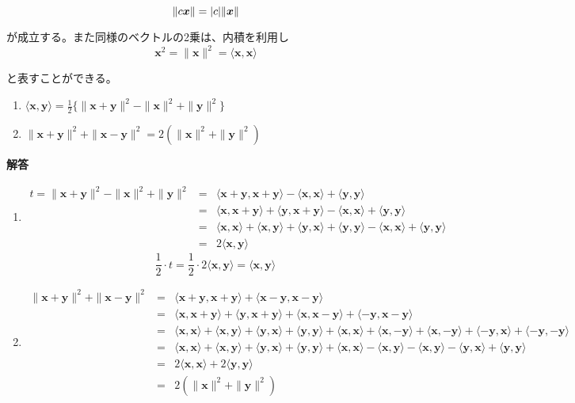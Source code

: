 \documentclass[dvipdfmx,autodetect-engine]{jsarticle}
\theoremstyle{definition}
\newcommand{\innerProduct}[2]{\langle \bm{#1}, \bm{#2} \rangle}
\newcommand{\nrm}[1]{\|\bm{#1}\|}
\DeclarePairedDelimiter{\abs}{\lvert}{\rvert}
\begin{document}
$$
\|c\bm{x}\| = \abs{c}\|\bm{x}\|
$$

が成立する。また同様のベクトルの2乗は、内積を利用し
$$
\bm{x}^2  = \nrm{x}^2 = \innerProduct{x}{x}
$$

と表すことができる。


\begin{enumerate}
\renewcommand{\labelenumi}{(\arabic{enumi})}
\item $\innerProduct{x}{y} = \frac{1}{2}\{ \|\bm{x} + \bm{y}\|^2 - \|\bm{x}\|^2 + \|\bm{y}\|^2 \}$
\item $\|\bm{x} + \bm{y}\|^2 + \|\bm{x} - \bm{y}\|^2 = 2(\|\bm{x}\|^2 + \|\bm{y}\|^2)$
\end{enumerate}

{\bf 解答}

\begin{enumerate}
\renewcommand{\labelenumi}{(\arabic{enumi})}

\item \begin{eqnarray*}
t = \|\bm{x} + \bm{y}\|^2 - \|\bm{x}\|^2 + \|\bm{y}\|^2 &= &\langle \bm{x} + \bm{y}, \bm{x} + \bm{y} \rangle - \innerProduct{x}{x} +\innerProduct{y}{y} \\
&= &\langle \bm{x}, \bm{x} + \bm{y} \rangle + \langle \bm{y}, \bm{x} + \bm{y} \rangle - \innerProduct{x}{x} +\innerProduct{y}{y} \\
&= &\innerProduct{x}{x} +\innerProduct{x}{y} + \innerProduct{y}{x} +\innerProduct{y}{y} - \innerProduct{x}{x} +\innerProduct{y}{y} \\
&= & 2 \innerProduct{x}{y}
\end{eqnarray*}
$$
\frac{1}{2} \cdot t = \frac{1}{2} \cdot 2\innerProduct{x}{y} = \innerProduct{x}{y}
$$

\item 
\begin{eqnarray*}
\|\bm{x} + \bm{y}\|^2 + \|\bm{x} - \bm{y}\|^2 &= &\langle \bm{x} + \bm{y}, \bm{x} + \bm{y} \rangle + \langle \bm{x} - \bm{y}, \bm{x} - \bm{y} \rangle \\
&= &\langle \bm{x}, \bm{x} + \bm{y} \rangle + \langle \bm{y}, \bm{x} + \bm{y} \rangle + \langle \bm{x}, \bm{x} - \bm{y} \rangle + \langle -\bm{y}, \bm{x} - \bm{y} \rangle \\
&= &\innerProduct{x}{x} + \innerProduct{x}{y} + \innerProduct{y}{x} + \innerProduct{y}{y} + \innerProduct{x}{x} + \innerProduct{x}{-y} + \innerProduct{x}{-y} + \innerProduct{-y}{x} + \innerProduct{-y}{-y} \\
&= &\innerProduct{x}{x} + \innerProduct{x}{y} + \innerProduct{y}{x} + \innerProduct{y}{y} + \innerProduct{x}{x} - \innerProduct{x}{y} - \innerProduct{x}{y} - \innerProduct{y}{x} + \innerProduct{y}{y} \\
&=& 2\innerProduct{x}{x} + 2 \innerProduct{y}{y} \\
&=& 2(\|\bm{x}\|^2 + \|\bm{y}\|^2)
\end{eqnarray*}

\end{enumerate}
\end{document}
